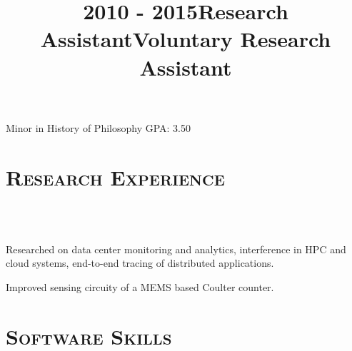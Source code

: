\begin{resume}
	\title{2010 - 2015}
	\begin{position}
		Minor in History of Philosophy \hfill GPA: 3.50 \hspace{-2.5mm}
	\end{position}



	\section{\textsc{Research Experience}}

	\begin{formatb}
		\\
		\body\\
	\end{formatb}

	\title{Research Assistant}
	\begin{position}
		Researched on data center monitoring and analytics, interference in HPC and
    cloud systems, end-to-end tracing of distributed applications.
	\end{position}

	\title{Voluntary Research Assistant}
	\begin{position}
		Improved sensing circuity of a MEMS based Coulter counter.
	\end{position}

	\section{\textsc{Software Skills}}


\end{resume}
